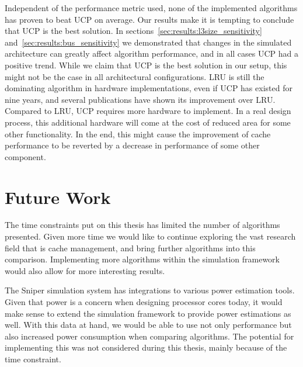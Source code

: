 Independent of the performance metric used, none of the implemented algorithms has proven to beat UCP on average.
Our results make it is tempting to conclude that UCP is the best solution.
In sections~\ref{sec:results:l3size_sensitivity} and~\ref{sec:results:bus_sensitivity} we demonstrated that changes in the simulated architecture can greatly affect algorithm performance, and in all cases UCP had a positive trend.
While we claim that UCP is the best solution in our setup, this might not be the case in all architectural configurations.
LRU is still the dominating algorithm in hardware implementations, even if UCP has existed for nine years, and several publications have shown its improvement over LRU.
Compared to LRU, UCP requires more hardware to implement. 
In a real design process, this additional hardware will come at the cost of reduced area for some other functionality.
In the end, this might cause the improvement of cache performance to be reverted by a decrease in performance of some other component.

\section{Future Work}

The time constraints put on this thesis has limited the number of algorithms presented.
Given more time we would like to continue exploring the vast research field that is cache management, and bring further algorithms into this comparison.
Implementing more algorithms within the simulation framework would also allow for more interesting results.

The Sniper simulation system has integrations to various power estimation tools.
Given that power is a concern when designing processor cores today, it would make sense to extend the simulation framework to provide power estimations as well.
With this data at hand, we would be able to use not only performance but also increased power consumption when comparing algorithms.
The potential for implementing this was not considered during this thesis, mainly because of the time constraint.